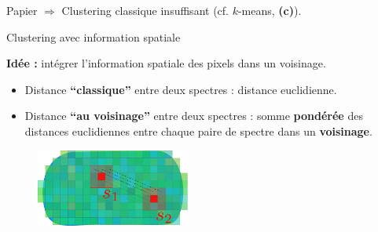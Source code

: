 \documentclass[10pt]{beamer}
\begin{document}
\begin{frame}{Papier}
  $\Rightarrow$ Clustering classique insuffisant (cf. $k$-means, \textbf{(c)}).

  
\end{frame}

\begin{frame}{Clustering avec information spatiale}

  \textbf{Idée :} intégrer l'information spatiale des pixels dans un voisinage.
  
  \begin{itemize}
  \item Distance \textbf{``classique''} entre deux spectres : distance euclidienne.
  \item Distance \textbf{``au voisinage''} entre deux spectres : somme
    \textbf{pondérée} des distances euclidiennes entre chaque paire de spectre dans un \textbf{voisinage}.
  \end{itemize}



  \begin{figure}[ht]
    \centering
    \includegraphics[width=0.45\textwidth]{fig/distance_pixels}
  \end{figure}

\end{frame}

  



\end{document}
